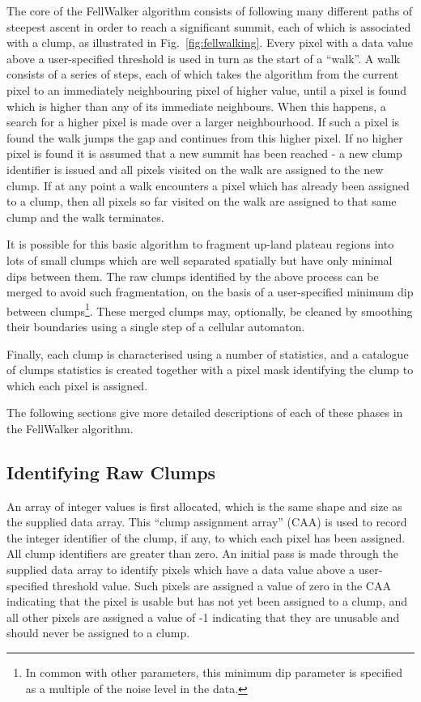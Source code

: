 \documentclass[final,authoryear,5p,times,twocolumn]{elsarticle}
\begin{document}
The core of the FellWalker algorithm consists of following many different
paths of steepest ascent in order to reach a significant summit, each of
which is associated with a clump, as illustrated in Fig.~\ref{fig:fellwalking}.
Every pixel with a data value above a user-specified threshold is used in
turn as the start of a ``walk''. A walk consists of a series of steps,
each of which takes the algorithm from the current pixel to an immediately
neighbouring pixel of higher value, until a pixel is found which is
higher than any of its immediate neighbours. When this happens, a search
for a higher pixel is made over a larger neighbourhood. If such a pixel
is found the walk jumps the gap and continues from this higher pixel. If no
higher pixel is found it is assumed that a new summit has been reached -
a new clump identifier is issued and all pixels visited on the walk are
assigned to the new clump. If at any point a walk encounters a pixel
which has already been assigned to a clump, then all pixels so far
visited on the walk are assigned to that same clump and the walk
terminates.

It is possible for this basic algorithm to fragment up-land plateau
regions into lots of small clumps which are well separated spatially but
have only minimal dips between them. The raw clumps identified by the above
process can be merged to avoid such fragmentation, on the basis of a
user-specified minimum dip between clumps\footnote{In common with other
parameters, this minimum dip parameter is specified as a multiple of the
noise level in the data.}. These merged clumps may,
optionally, be cleaned by smoothing their boundaries using a single step
of a cellular automaton.

Finally, each clump is characterised using a number of statistics, and a
catalogue of clumps statistics is created together with a pixel mask
identifying the clump to which each pixel is assigned.

The following sections give more detailed descriptions of each of these
phases in the FellWalker algorithm.

\subsection{Identifying Raw Clumps}
\label{sec:raw}
An array of integer values is first allocated, which is the same shape
and size as the supplied data array. This ``clump assignment array''
(CAA) is used to record the integer identifier of the clump, if any, to
which each pixel has been assigned. All clump identifiers are greater
than zero. An initial pass is made through the supplied data array to
identify pixels which have a data value above a user-specified threshold
value. Such pixels are assigned a value of zero in the CAA indicating
that the pixel is usable but has not yet been assigned to a clump, and
all other pixels are assigned a value of -1 indicating that they are
unusable and should never be assigned to a clump.
\end{document}
